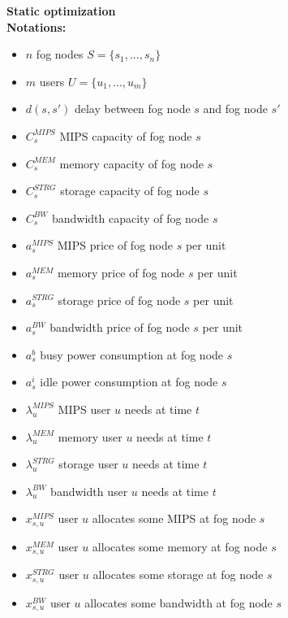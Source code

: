\documentclass{article}
\begin{document}
\noindent\textbf{Static optimization}\\[12pt]
\noindent\textbf{Notations:}
\begin{itemize}
	\item $n$ fog nodes $S=\{s_1, ..., s_n\}$
	\item $m$ users $U=\{u_1, ..., u_m\}$
	\item $d(s, s')$ delay between fog node $s$ and fog node $s'$\\
	
	\item $C^{MIPS}_{s}$ MIPS capacity of fog node $s$
	\item $C^{MEM}_{s}$ memory capacity of fog node $s$
	\item $C^{STRG}_{s}$ storage capacity of fog node $s$
	\item $C^{BW}_{s}$ bandwidth capacity of fog node $s$\\
	
	\item $a^{MIPS}_{s}$ MIPS price of fog node $s$ per unit
	\item $a^{MEM}_{s}$ memory price of fog node $s$ per unit
	\item $a^{STRG}_{s}$ storage price of fog node $s$ per unit
	\item $a^{BW}_{s}$ bandwidth price of fog node $s$ per unit
	\item $a^b_{s}$ busy power consumption at fog node $s$
	\item $a^i_{s}$ idle power consumption at fog node $s$\\
	
	\item $\lambda^{MIPS}_{u}$ MIPS user $u$ needs at time $t$
	\item $\lambda^{MEM}_{u}$ memory user $u$ needs at time $t$
	\item $\lambda^{STRG}_{u}$ storage user $u$ needs at time $t$
	\item $\lambda^{BW}_{u}$ bandwidth user $u$ needs at time $t$\\
	
	\item $x^{MIPS}_{s,u}$ user $u$ allocates some MIPS at fog node $s$
	\item $x^{MEM}_{s,u}$ user $u$ allocates some memory at fog node $s$
	\item $x^{STRG}_{s,u}$ user $u$ allocates some storage at fog node $s$
	\item $x^{BW}_{s,u}$ user $u$ allocates some bandwidth at fog node $s$\\
\end{itemize}
\end{document}
